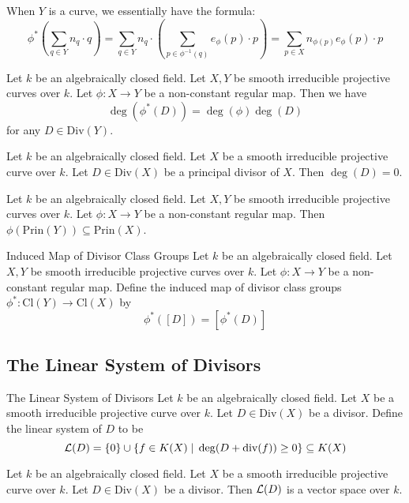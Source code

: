 \documentclass[a4paper]{article}
\begin{document}
When $Y$ is a curve, we essentially have the formula: $$\phi^\ast\left(\sum_{q\in Y} n_q\cdot q\right)=\sum_{q\in Y}n_q\cdot\left(\sum_{p\in\phi^{-1}(q)}e_\phi(p)\cdot p\right)=\sum_{p\in X}n_{\phi(p)}e_\phi(p)\cdot p$$

\begin{prp}{}{} Let $k$ be an algebraically closed field. Let $X,Y$ be smooth irreducible projective curves over $k$. Let $\phi:X\to Y$ be a non-constant regular map. Then we have $$\deg(\phi^\ast(D))=\deg(\phi)\deg(D)$$ for any $D\in\text{Div}(Y)$. 
\end{prp}

\begin{prp}{}{} Let $k$ be an algebraically closed field. Let $X$ be a smooth irreducible projective curve over $k$. Let $D\in\text{Div}(X)$ be a principal divisor of $X$. Then $\deg(D)=0$. 
\end{prp}

\begin{prp}{}{} Let $k$ be an algebraically closed field. Let $X,Y$ be smooth irreducible projective curves over $k$. Let $\phi:X\to Y$ be a non-constant regular map. Then $\phi(\text{Prin}(Y))\subseteq\text{Prin}(X)$. 
\end{prp}

\begin{defn}{Induced Map of Divisor Class Groups}{} Let $k$ be an algebraically closed field. Let $X,Y$ be smooth irreducible projective curves over $k$. Let $\phi:X\to Y$ be a non-constant regular map. Define the induced map of divisor class groups $\phi^\ast:\text{Cl}(Y)\to\text{Cl}(X)$ by $$\phi^\ast([D])=[\phi^\ast(D)]$$
\end{defn}

\subsection{The Linear System of Divisors}
\begin{defn}{The Linear System of Divisors}{} Let $k$ be an algebraically closed field. Let $X$ be a smooth irreducible projective curve over $k$. Let $D\in\text{Div}(X)$ be a divisor. Define the linear system of $D$ to be $$\mathcal{L}(D)=\{0\}\cup\{f\in K(X)\;|\;\deg(D+\text{div}(f))\geq 0\}\subseteq K(X)$$
\end{defn}

\begin{lmm}{}{} Let $k$ be an algebraically closed field. Let $X$ be a smooth irreducible projective curve over $k$. Let $D\in\text{Div}(X)$ be a divisor. Then $\mathcal{L}(D)$ is a vector space over $k$. 
\end{lmm}
\end{document}
